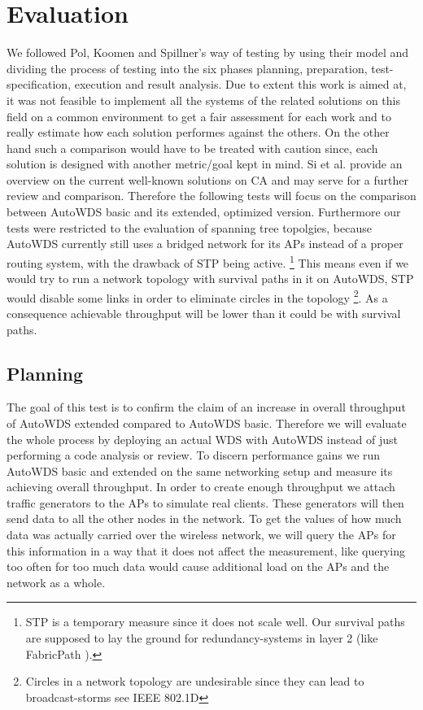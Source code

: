 \chapter{Evaluation}
We followed Pol, Koomen and Spillner's way of testing \cite{pol2000management} by using their model and dividing the process of testing into the 
six phases planning, preparation, test-specification, execution and result analysis. Due to extent this work is aimed at, 
it was not feasible to implement all the systems of the related solutions on this field on a common environment
to get a fair assessment for each work and to really estimate how each solution performes against the others. 
On the other hand such a comparison would have to be treated with caution since, each solution is designed with another metric/goal kept in mind.
Si et al. \cite{overview_caa} provide an overview on the current well-known solutions on \ac{CA} and may serve for a further review and comparison.
Therefore the following tests will focus on the comparison between AutoWDS basic and its extended, optimized version.
Furthermore our tests were restricted to the evaluation of spanning tree topolgies, because AutoWDS currently 
still uses a bridged network for its APs instead of a proper routing system, with the drawback of \ac{STP} being active.
\footnote{\ac{STP} is a temporary measure since it does not scale well. 
Our survival paths are supposed to lay the ground for redundancy-systems in layer 2 (like FabricPath \cite{fabricpath}).} 
This means even if we would try to run a network topology with survival paths in it on AutoWDS, \ac{STP} would disable some links in order to 
eliminate circles in the topology \footnote{Circles in a network topology are undesirable since they can lead to broadcast-storms see \ac{IEEE} 802.1D}.
As a consequence achievable throughput will be lower than it could be with survival paths.

\newpage

  \section{Planning}
    The goal of this test is to confirm the claim of an increase in overall throughput of AutoWDS extended compared to AutoWDS basic.
    Therefore we will evaluate the whole process by deploying an actual \ac{WDS} with AutoWDS instead of just performing a code analysis or review.
    To discern performance gains we run AutoWDS basic and extended on the same networking setup and measure its achieving overall throughput.
    In order to create enough throughput we attach traffic generators to the APs to simulate real clients.
    These generators will then send data to all the other nodes in the network.
    To get the values of how much data was actually carried over the wireless network, we will query the APs for this information in a way that it 
    does not affect the measurement, like querying too often for too much data would cause additional load on the APs and the network as a whole.
    
